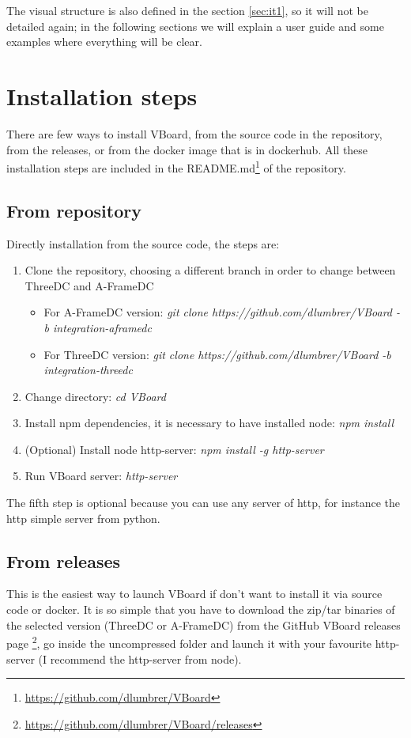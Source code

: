 \documentclass[a4paper, 12pt]{book}
\begin{document}
The visual structure is also defined in the section \ref{sec:it1}, so it will not be detailed again; in the following sections we will explain a user guide and some examples where everything will be clear.


\section{Installation steps}
There are few ways to install VBoard, from the source code in the repository, from the releases, or from the docker image that is in dockerhub. All these installation steps are included in the README.md\footnote{\url{https://github.com/dlumbrer/VBoard}} of the repository.

\subsection{From repository}
Directly installation from the source code, the steps are:
\begin{enumerate}
    \item Clone the repository, choosing a different branch in order to change between ThreeDC and A-FrameDC
    \begin{itemize}
        \item For A-FrameDC version: \textit{git clone https://github.com/dlumbrer/VBoard -b integration-aframedc}
        \item For ThreeDC version: \textit{git clone https://github.com/dlumbrer/VBoard -b integration-threedc}
    \end{itemize}
    \item Change directory: \textit{cd VBoard}
    \item Install npm dependencies, it is necessary to have installed node: \textit{npm install}
    \item (Optional) Install node http-server: \textit{npm install -g http-server}
    \item Run VBoard server: \textit{http-server}
\end{enumerate}

The fifth step is optional because you can use any server of http, for instance the http simple server from python.

\subsection{From releases}
This is the easiest way to launch VBoard if don't want to install it via source code or docker. It is so simple that you have to download the zip/tar binaries of the selected version (ThreeDC or A-FrameDC) from the GitHub VBoard releases page \footnote{\url{https://github.com/dlumbrer/VBoard/releases}}, go inside the uncompressed folder and launch it with your favourite http-server (I recommend the http-server from node).
\end{document}
